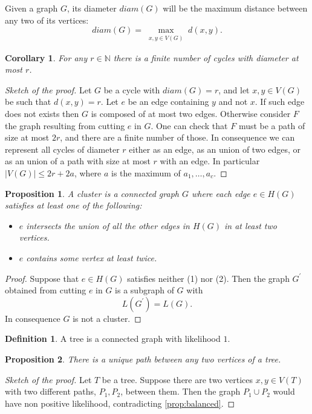 \documentclass[11pt,notitlepage]{report}
\newtheorem{proposition}{Proposition}[chapter]
\newtheorem{corollary}{Corollary}[chapter]
\theoremstyle{definition}
\newtheorem{definition}{Definition}[chapter]
\newcommand{\N}{\mathbb{N}}
\begin{document}
Given a graph $G$, its diameter $diam(G)$ will be the maximum distance
between any two of its vertices:
\[diam(G)=\max_{\substack{x,y\in V(G)}} d(x,y).\]

\begin{corollary}\label{cor:finitecycles}
	For any $r\in \N$ there is a finite number of 
	cycles with diameter at most $r$.
\end{corollary}
\begin{proof}[Sketch of the proof]
	Let $G$ be a cycle with $diam(G)=r$, and let
	$x,y\in V(G)$ be such that $d(x,y)=r$. Let $e$
	be an edge containing $y$ and not $x$. If such edge
	does not exists then $G$ is composed of at most two edges.
	Otherwise
	consider $F$ the graph resulting from cutting $e$ in $G$. 
	One can check that $F$ must be a path of size at most $2r$, 
	and there are a finite number of those.
	In consequence we can represent all cycles of diameter $r$
	either as an edge, as an union of two edges, or as an
	union of a path with size at most $r$ with an edge. 
	In particular $|V(G)|\leq 2r+2a$, where $a$ is the
	maximum of $a_1,\dots, a_c$.
\end{proof}


\begin{proposition}
	A cluster is a connected graph $G$ where each edge
	$e\in H(G)$
	satisfies at least one of the following:
	\begin{itemize}
		\item[(1)] $e$ intersects the union of all the other edges
		in $H(G)$ in at least two vertices.
		 \item[(2)] $e$ contains some vertex at least twice.
	\end{itemize}
\end{proposition}
\begin{proof}
	Suppose that $e\in H(G)$ satisfies neither (1) nor (2). Then
	the graph $G^\prime$ obtained from cutting $e$ in $G$ is a subgraph
	of $G$ with
	\[L(G^\prime)= L(G).\]
	In consequence $G$ is not a cluster. 
\end{proof}

\begin{definition} 
	A tree is a connected graph with likelihood $1$.
\end{definition}

\begin{proposition} There is a unique path between any two vertices of a tree. 
\end{proposition}
\begin{proof}[Sketch of the proof]
	Let $T$ be a tree. Suppose there are 
	two vertices $x, y\in V(T)$
	with two different paths, $P_1,P_2$, between them. 
	Then the graph $P_1\cup P_2$ would have non positive
	likelihood, contradicting \cref{prop:balanced}.
\end{proof}
\end{document}
